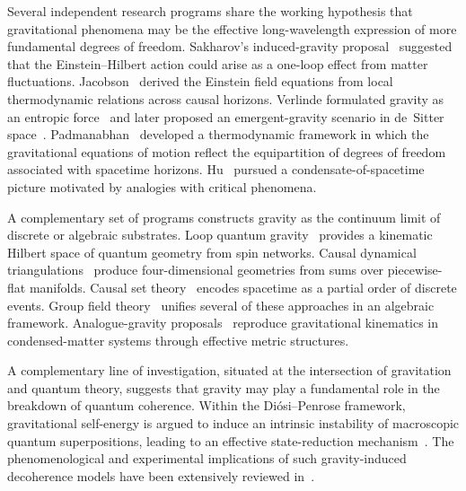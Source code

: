 \documentclass[a4paper,fleqn]{cas-dc}
\theoremstyle{thmstyleone}%
\theoremstyle{thmstyletwo}%
\begin{document}
Several independent research programs share the working
hypothesis that gravitational phenomena may be the effective
long-wavelength expression of more fundamental degrees of
freedom. Sakharov's induced-gravity proposal~\cite{Sakharov1968}
suggested that the Einstein--Hilbert action could arise as a
one-loop effect from matter fluctuations.
Jacobson~\cite{Jacobson1995} derived the Einstein field
equations from local thermodynamic relations across causal
horizons. Verlinde formulated gravity as an entropic
force~\cite{Verlinde2011} and later proposed an emergent-gravity
scenario in de~Sitter space~\cite{Verlinde2017}.
Padmanabhan~\cite{Padmanabhan2010} developed a thermodynamic
framework in which the gravitational equations of motion
reflect the equipartition of degrees of freedom associated with
spacetime horizons. Hu~\cite{Hu2005} pursued a
condensate-of-spacetime picture motivated by analogies with
critical phenomena.

A complementary set of programs constructs gravity as the
continuum limit of discrete or algebraic substrates. Loop
quantum gravity~\cite{Rovelli2004,AshtekarLewandowski2004}
provides a kinematic Hilbert space of quantum geometry from
spin networks. Causal dynamical triangulations~\cite{AJL2012}
produce four-dimensional geometries from sums over
piecewise-flat manifolds. Causal set
theory~\cite{Sorkin1991} encodes spacetime as a partial order
of discrete events. Group field theory~\cite{Oriti2012} unifies
several of these approaches in an algebraic
framework. Analogue-gravity
proposals~\cite{Volovik2003,BarceloLiberatiVisser2011}
reproduce gravitational kinematics in condensed-matter systems
through effective metric structures.

A complementary line of investigation, situated at the
intersection of gravitation and quantum theory, suggests that
gravity may play a fundamental role in the breakdown of quantum
coherence. Within the Di\'osi--Penrose framework, gravitational
self-energy is argued to induce an intrinsic instability of
macroscopic quantum superpositions, leading to an effective
state-reduction mechanism~\cite{Diosi1989,Penrose1996}. The
phenomenological and experimental implications of such
gravity-induced decoherence models have been extensively
reviewed in~\cite{BassiGrossardtUlbricht2017}.
\end{document}
